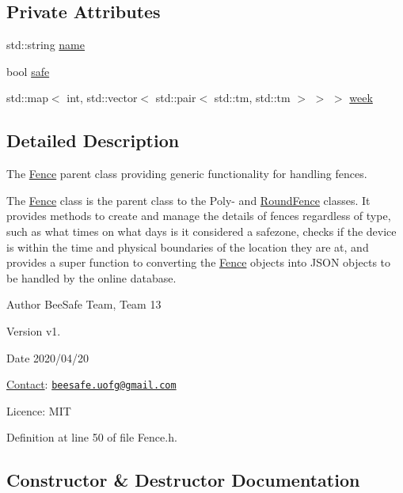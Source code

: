 \subsection*{Private Attributes}
\begin{DoxyCompactItemize}
\item 
std\+::string \hyperlink{class_fence_aa405676733f25812b38ea0dd9ccd1863}{name}
\item 
bool \hyperlink{class_fence_ad570430040eee657c625a67d5589c4b5}{safe}
\item 
std\+::map$<$ int, std\+::vector$<$ std\+::pair$<$ std\+::tm, std\+::tm $>$ $>$ $>$ \hyperlink{class_fence_ae589e973fa03316847aeceedd72e2b64}{week}
\end{DoxyCompactItemize}


\subsection{Detailed Description}
The \hyperlink{class_fence}{Fence} parent class providing generic functionality for handling fences. 

The \hyperlink{class_fence}{Fence} class is the parent class to the Poly-\/ and \hyperlink{class_round_fence}{Round\+Fence} classes. It provides methods to create and manage the details of fences regardless of type, such as what times on what days is it considered a safezone, checks if the device is within the time and physical boundaries of the location they are at, and provides a super function to converting the \hyperlink{class_fence}{Fence} objects into J\+S\+ON objects to be handled by the online database.

\begin{DoxyAuthor}{Author}
Bee\+Safe Team, Team 13
\end{DoxyAuthor}
\begin{DoxyVersion}{Version}
v1.
\end{DoxyVersion}
\begin{DoxyDate}{Date}
2020/04/20
\end{DoxyDate}
\hyperlink{class_contact}{Contact}\+: \href{mailto:beesafe.uofg@gmail.com}{\tt beesafe.\+uofg@gmail.\+com}

Licence\+: M\+IT 

Definition at line 50 of file Fence.\+h.



\subsection{Constructor \& Destructor Documentation}
\mbox{\label{class_fence_a5c2be718e885ed9ae2ca048406d126b3}} 
